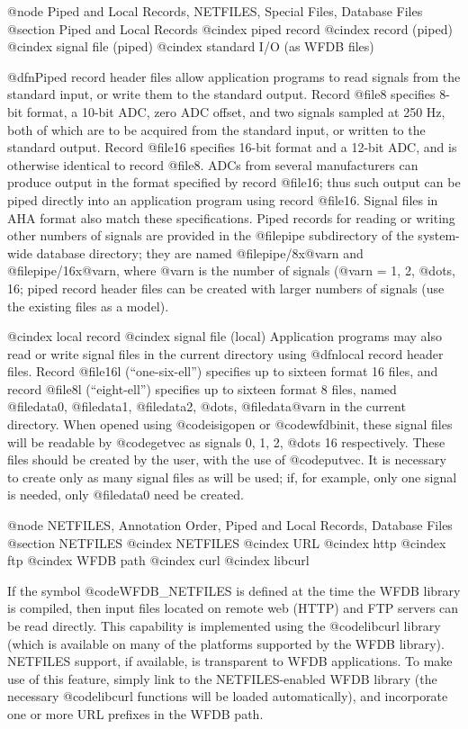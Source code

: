 {{{{{{{{{@node     Piped and Local Records, NETFILES, Special Files, Database Files
@section Piped and Local Records
@cindex piped record
@cindex record (piped)
@cindex signal file (piped)
@cindex standard I/O (as WFDB files)

@dfn{Piped record} header files allow application programs to read signals from
the standard input, or write them to the standard output.  Record @file{8}
specifies 8-bit format, a 10-bit ADC, zero ADC offset, and two signals sampled
at 250 Hz, both of which are to be acquired from the standard input, or written
to the standard output.  Record @file{16} specifies 16-bit format and a 12-bit
ADC, and is otherwise identical to record @file{8}.  ADCs from several
manufacturers can produce output in the format specified by record @file{16};
thus such output can be piped directly into an application program using record
@file{16}.  Signal files in AHA format also match these specifications.  Piped
records for reading or writing other numbers of signals are provided in the
@file{pipe} subdirectory of the system-wide database directory; they are named
@file{pipe/8x@var{n}} and @file{pipe/16x@var{n}}, where @var{n} is the number
of signals (@var{n} = 1, 2, @dots{}, 16; piped record header files can be
created with larger numbers of signals (use the existing files as a model).

@cindex local record
@cindex signal file (local)
Application programs may also read or write signal files in the current
directory using @dfn{local record} header files.  Record
@file{16l} (``one-six-ell'') specifies up to sixteen format 16
files, and record @file{8l} (``eight-ell'') specifies up to
sixteen format 8 files, named @file{data0}, @file{data1},
@file{data2}, @dots{}, @file{data@var{n}} in the current directory.
When opened using @code{isigopen} or @code{wfdbinit}, these signal files
will be readable by @code{getvec} as signals 0, 1, 2, @dots{} 16
respectively.  These files should be created by the user, with the use
of @code{putvec}.  It is necessary to create only as many signal files
as will be used; if, for example, only one signal is needed, only
@file{data0} need be created.


@node     NETFILES, Annotation Order, Piped and Local Records, Database Files
@section NETFILES
@cindex NETFILES
@cindex URL
@cindex http
@cindex ftp
@cindex WFDB path
@cindex curl
@cindex libcurl

If the symbol @code{WFDB_NETFILES} is defined at the time the WFDB library is
compiled, then input files located on remote web (HTTP) and FTP servers can be
read directly.  This capability is implemented using the @code{libcurl} library
(which is available on many of the platforms supported by the WFDB library).
NETFILES support, if available, is transparent to WFDB applications.  To make
use of this feature, simply link to the NETFILES-enabled WFDB library (the
necessary @code{libcurl} functions will be loaded automatically), and
incorporate one or more URL prefixes in the WFDB path.

}}}}}}}}}
